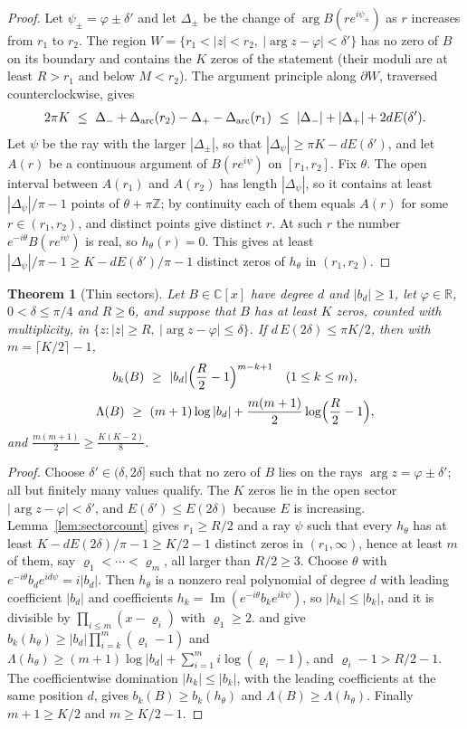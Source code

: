 \documentclass[11pt]{article}
\newtheorem{theorem}{Theorem}[section]
\newcommand{\R}{\mathbb R}
\begin{document}
\begin{proof}
Let $\psi_\pm=\varphi\pm\delta'$ and let $\Delta_\pm$ be the change of
$\arg B(re^{i\psi_\pm})$ as $r$ increases from $r_1$ to $r_2$.  The region
$W=\{r_1<|z|<r_2,\ |\arg z-\varphi|<\delta'\}$ has no zero of $B$ on its
boundary and contains the $K$ zeros of the statement (their moduli are at
least $R>r_1$ and below $M<r_2$).  The argument principle along
$\partial W$, traversed counterclockwise, gives
\[
  2\pi K\ \le\ \Delta_-+\Delta_{\rm arc}(r_2)-\Delta_+-\Delta_{\rm arc}(r_1)
  \ \le\ |\Delta_-|+|\Delta_+|+2dE(\delta').
\]
Let $\psi$ be the ray with the larger $|\Delta_\pm|$, so that
$|\Delta_\psi|\ge\pi K-dE(\delta')$, and let $A(r)$ be a continuous argument of
$B(re^{i\psi})$ on $[r_1,r_2]$.  Fix $\theta$.  The open interval between
$A(r_1)$ and $A(r_2)$ has length $|\Delta_\psi|$, so it contains at least
$|\Delta_\psi|/\pi-1$ points of $\theta+\pi\mathbb Z$; by continuity each of
them equals $A(r)$ for some $r\in(r_1,r_2)$, and distinct points give distinct
$r$.  At such $r$ the number $e^{-i\theta}B(re^{i\psi})$ is real, so
$h_\theta(r)=0$.  This gives at least $|\Delta_\psi|/\pi-1\ge K-dE(\delta')/\pi-1$
distinct zeros of $h_\theta$ in $(r_1,r_2)$.
\end{proof}

\begin{theorem}[Thin sectors]\label{thm:thinsector}
Let $B\in\mathbb C[x]$ have degree $d$ and $|b_d|\ge1$, let $\varphi\in\R$,
$0<\delta\le\pi/4$ and $R\ge6$, and suppose that $B$ has at least $K$ zeros,
counted with multiplicity, in $\{z:|z|\ge R,\ |\arg z-\varphi|\le\delta\}$.  If
$d\,E(2\delta)\le\pi K/2$, then with $m=\lceil K/2\rceil-1$,
\[
  b_k(B)\ \ge\ |b_d|\Bigl(\frac R2-1\Bigr)^{m-k+1}\quad(1\le k\le m),
\]
\[
  \Lambda(B)\ \ge\ (m+1)\log|b_d|+\frac{m(m+1)}2\log\Bigl(\frac R2-1\Bigr),
\]
and $\frac{m(m+1)}2\ge\frac{K(K-2)}8$.
\end{theorem}

\begin{proof}
Choose $\delta'\in(\delta,2\delta]$ such that no zero of $B$ lies on the rays
$\arg z=\varphi\pm\delta'$; all but finitely many values qualify.  The $K$
zeros lie in the open sector $|\arg z-\varphi|<\delta'$, and $E(\delta')\le
E(2\delta)$ because $E$ is increasing.  Lemma~\ref{lem:sectorcount} gives
$r_1\ge R/2$ and a ray $\psi$ such that every $h_\theta$ has at least
$K-dE(2\delta)/\pi-1\ge K/2-1$ distinct zeros in $(r_1,\infty)$, hence at least
$m$ of them, say $\varrho_1<\cdots<\varrho_m$, all larger than $R/2\ge3$.
Choose $\theta$ with $e^{-i\theta}b_de^{id\psi}=i|b_d|$.  Then $h_\theta$ is a
nonzero real polynomial of degree $d$ with leading coefficient $|b_d|$ and
coefficients $h_k=\operatorname{Im}(e^{-i\theta}b_ke^{ik\psi})$, so
$|h_k|\le|b_k|$, and it is divisible by $\prod_{i\le m}(x-\varrho_i)$ with
$\varrho_1\ge2$.  \cite[Theorem~3.2]{coefficient-mass} and \cite[Corollary~3.4]{coefficient-mass} give
$b_k(h_\theta)\ge|b_d|\prod_{i=k}^m(\varrho_i-1)$ and
$\Lambda(h_\theta)\ge(m+1)\log|b_d|+\sum_{i=1}^mi\log(\varrho_i-1)$, and
$\varrho_i-1>R/2-1$.  The coefficientwise domination $|h_k|\le|b_k|$, with the
leading coefficients at the same position $d$, gives $b_k(B)\ge b_k(h_\theta)$
and $\Lambda(B)\ge\Lambda(h_\theta)$.  Finally $m+1\ge K/2$ and $m\ge K/2-1$.
\end{proof}
\end{document}
